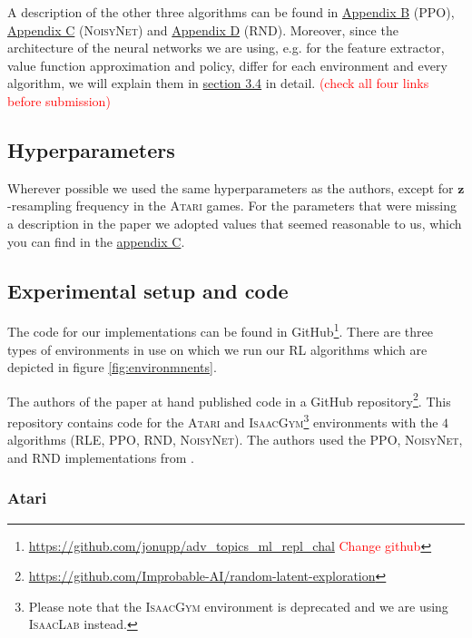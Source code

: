 \documentclass[10pt]{article} %
\begin{document}
\noindent A description of the other three algorithms can be found in \hyperlink{algo-ppo}{Appendix B} (\textsc{PPO}), \hyperlink{algo-noisynet}{Appendix C} (\textsc{NoisyNet}) and \hyperlink{algo-rnd}{Appendix D} (\textsc{RND}). Moreover, since the architecture of the neural networks we are using, e.g. for the feature extractor, value function approximation and policy, differ for each environment and every algorithm, we will explain them in \hyperlink{experimental-setup}{section 3.4} in detail. \textcolor{red}{(check all four links before submission)}

\hypertarget{hyperparameter-subsection}{\subsection{Hyperparameters}}

Wherever possible we used the same hyperparameters as the authors, except for $\textbf{z}$-resampling frequency in the \textsc{Atari} games. For the parameters that were missing a description in the paper we adopted values that seemed reasonable to us, which you can find in the \hyperlink{appendix-hyperparams}{appendix C}.

\hypertarget{experimental-setup}{\subsection{Experimental setup and code}}

The code for our implementations can be found in GitHub\footnote{\href{https://github.com/jonupp/adv_topics_ml_repl_chal}{https://github.com/jonupp/adv\_topics\_ml\_repl\_chal} \textcolor{red}{Change github}}. There are three types of environments in use on which we run our RL algorithms which are depicted in figure \ref{fig:environmnents}. 

\noindent The authors of the paper at hand published code in a GitHub repository\footnote{\href{https://github.com/Improbable-AI/random-latent-exploration}{https://github.com/Improbable-AI/random-latent-exploration}}. This repository contains code for the \textsc{Atari} and \textsc{IsaacGym}\footnote{Please note that the \textsc{IsaacGym} environment is deprecated and we are using \textsc{IsaacLab} instead.} environments with the $4$ algorithms (\textsc{RLE}, \textsc{PPO}, \textsc{RND}, \textsc{NoisyNet}). The authors used the \textsc{PPO}, \textsc{NoisyNet}, and \textsc{RND} implementations from \cite{clearnrl-paper}.

\subsubsection{Atari}
\end{document}
